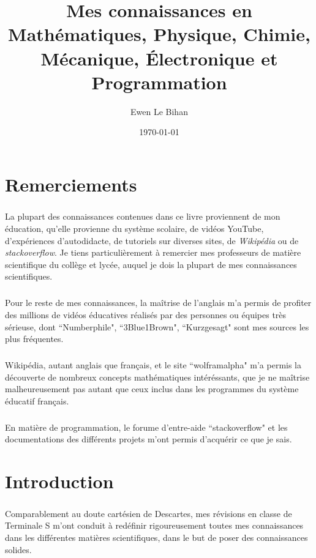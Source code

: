 \documentclass[a4paper]{book}
\title{Mes connaissances en Mathématiques, Physique, Chimie, Mécanique, Électronique et Programmation}
\author{Ewen Le Bihan}
\date{\today}
\begin{document}
 
\maketitle
 
    \frontmatter
 
    \chapter{Remerciements}
    \paragraph{}
    La plupart des connaissances contenues dans ce livre proviennent de mon éducation, qu'elle provienne du système scolaire, de vidéos YouTube, d'expériences d'autodidacte, de tutoriels sur diverses sites, de \emph{Wikipédia} ou de \emph{stackoverflow}. Je tiens particulièrement à remercier mes professeurs de matière scientifique du collège et lycée, auquel je dois la plupart de mes connaissances scientifiques.
    \paragraph{}
    Pour le reste de mes connaissances, la maîtrise de l'anglais m'a permis de profiter des millions de vidéos éducatives réalisés par des personnes ou équipes très sérieuse, dont ``Numberphile", ``3Blue1Brown", ``Kurzgesagt" sont mes sources les plus fréquentes.
    \paragraph{}
    Wikipédia, autant anglais que français, et le site ``wolframalpha" m'a permis la découverte de nombreux concepts mathématiques intéréssants, que je ne maîtrise malheureusement pas autant que ceux inclus dans les programmes du système éducatif français.
    \paragraph{}
    En matière de programmation, le forume d'entre-aide ``stackoverflow" et les documentations des différents projets m'ont permis d'acquérir ce que je sais.
    \chapter{Introduction}
    \paragraph{}
    Comparablement au doute cartésien de Descartes, mes révisions en classe de Terminale S m'ont conduit à redéfinir rigoureusement toutes mes connaissances dans les différentes matières scientifiques, dans le but de poser des connaissances solides.
\end{document}
